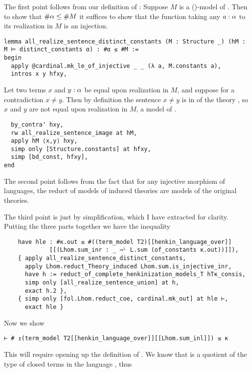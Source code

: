 The first point follows from our definition of :
Suppose $M$ is a ()-model of
.
Then to show that $\# \alpha \le \# M$ it suffices to show that the function
taking any $a : \alpha$ to its realization in $M$ is an injection.
\begin{lstlisting}
lemma all_realize_sentence_distinct_constants (M : Structure _) (hM : M ⊨ distinct_constants α) : #α ≤ #M :=
begin
  apply @cardinal.mk_le_of_injective _ _ (λ a, M.constants a),
  intros x y hfxy, \end{lstlisting}
Let two terms $x$ and $y : \alpha$ be equal upon realization in $M$,
and suppose for a contradiction $x \ne y$.
Then by definition the sentence $x \ne y$ is in
of the theory , so
$x$ and $y$ are not equal upon realization in $M$,
a model of .
\begin{lstlisting}
  by_contra' hxy,
  rw all_realize_sentence_image at hM,
  apply hM ⟨x,y⟩ hxy,
  simp only [Structure.constants] at hfxy,
  simp [bd_const, hfxy],
end \end{lstlisting}

The second point follows from the fact that
for any injective morphism of languages,
the reduct of models of induced theories are models of the original theories.

The third point is just by simplification, which I have extracted for clarity.
Putting the three parts together we have the inequality
\begin{lstlisting}
    have hle : #κ.out ≤ #((term_model T2)[[henkin_language_over]]
             [[(Lhom.sum_inr : _ →ᴸ L.sum (of_constants κ.out))]]),
    { apply all_realize_sentence_distinct_constants,
      apply Lhom.reduct_Theory_induced Lhom.sum.is_injective_inr,
      have h := reduct_of_complete_henkinization_models_T hTκ_consis,
      simp only [all_realize_sentence_union] at h,
      exact h.2 },
    { simp only [fol.Lhom.reduct_coe, cardinal.mk_out] at hle ⊢,
      exact hle } \end{lstlisting}

Now we show
\begin{lstlisting}
⊢ # ↥(term_model T2[[henkin_language_over]][[Lhom.sum_inl]]) ≤ κ \end{lstlisting}
This will require opening up the definition of .
We know that  is a quotient of the type of closed
terms in the language , thus

